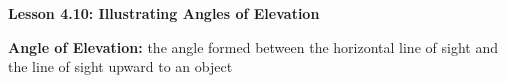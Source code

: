 \begin{center}
\textbf{Lesson 4.10: Illustrating Angles of Elevation}
\end{center}

\vspace*{-1.5ex}

\noindent \textbf{Angle of Elevation:} the angle formed between the horizontal line of sight and the line of sight upward to an object



